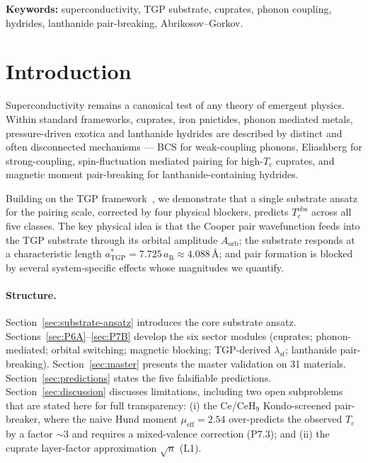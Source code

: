 \documentclass[11pt,a4paper]{article}
\newcommand{\lamsf}{\lambda_{\mathrm{sf}}}
\newcommand{\Tcobs}{T_{c}^{\mathrm{obs}}}
\begin{document}
\noindent\textbf{Keywords:}
superconductivity, TGP substrate, cuprates, phonon coupling,
hydrides, lanthanide pair-breaking, Abrikosov--Gorkov.

\tableofcontents
\newpage

\section{Introduction}\label{sec:intro}

Superconductivity remains a canonical test of any theory of emergent
physics. Within standard frameworks, cuprates, iron pnictides, phonon
mediated metals, pressure-driven exotica and lanthanide hydrides are
described by distinct and often disconnected mechanisms --- BCS for
weak-coupling phonons, Eliashberg for strong-coupling, spin-fluctuation
mediated pairing for high-$T_{c}$ cuprates, and magnetic moment
pair-breaking for lanthanide-containing hydrides.

Building on the TGP framework~\cite{TGP-core}, we demonstrate that a single
substrate ansatz for the pairing scale, corrected by four physical
blockers, predicts $\Tcobs$ across all five classes. The key physical idea
is that the Cooper pair wavefunction feeds into the TGP substrate through
its orbital amplitude $A_{\mathrm{orb}}$; the substrate responds at a
characteristic length $a^{\ast}_{\mathrm{TGP}}=7.725\,a_{\mathrm{B}}
\approx 4.088$\,\AA; and pair formation is blocked by several
system-specific effects whose magnitudes we quantify.

\paragraph{Structure.} Section~\ref{sec:substrate-ansatz} introduces the
core substrate ansatz. Sections~\ref{sec:P6A}--\ref{sec:P7B} develop the
six sector modules (cuprates; phonon-mediated; orbital switching;
magnetic blocking; TGP-derived $\lamsf$; lanthanide pair-breaking).
Section~\ref{sec:master} presents the master validation on 31 materials.
Section~\ref{sec:predictions} states the five falsifiable
predictions. Section~\ref{sec:discussion} discusses limitations,
including two open subproblems that are stated here for full
transparency: (i) the Ce/CeH$_{9}$ Kondo-screened pair-breaker, where
the naive Hund moment $\mu_{\mathrm{eff}}=2.54$ over-predicts the
observed $T_{c}$ by a factor $\sim\!3$ and requires a mixed-valence
correction (P7.3); and (ii) the cuprate layer-factor approximation
$\sqrt{n}$ (L1).
\end{document}
